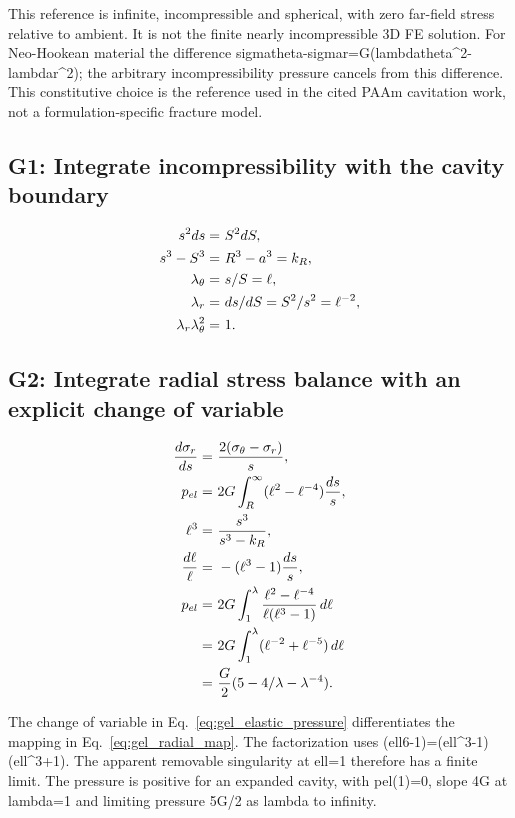 \documentclass[11pt]{article}
\begin{document}
This reference is infinite, incompressible and spherical, with zero far-field stress relative to ambient. It is not the finite nearly incompressible 3D FE solution. For Neo-Hookean material the difference sigmatheta-sigmar=G(lambdatheta\textasciicircum{}2-lambdar\textasciicircum{}2); the arbitrary incompressibility pressure cancels from this difference. This constitutive choice is the reference used in the cited PAAm cavitation work, not a formulation-specific fracture model.

\subsection{G1: Integrate incompressibility with the cavity boundary}

\begin{align}
s^2ds= & ~S^2dS, \notag \\
s^3-S^3= & ~R^3-a^3=k_R, \notag \\
\lambda_\theta= & ~s/S=\ell, \notag \\
\lambda_r= & ~ds/dS=S^2/s^2=\ell^{-2}, \notag \\
\lambda_r\lambda_\theta^2= & ~1. \label{eq:gel_radial_map}
\end{align}

\subsection{G2: Integrate radial stress balance with an explicit change of variable}

\begin{align}
\frac{d\sigma_r}{ds}= & ~\frac{2(\sigma_\theta-\sigma_r)}s, \notag \\
p_{el}= & ~2G\int_R^\infty(\ell^2-\ell^{-4})\frac{ds}s, \notag \\
\ell^3= & ~\frac{s^3}{s^3-k_R}, \notag \\
\frac{d\ell}{\ell}= & ~-(\ell^3-1)\frac{ds}s, \notag \\
p_{el}= & ~2G\int_1^\lambda\frac{\ell^2-\ell^{-4}}{\ell(\ell^3-1)}\,d\ell \notag \\
= & ~2G\int_1^\lambda(\ell^{-2}+\ell^{-5})\,d\ell \notag \\
= & ~\frac G2(5-4/\lambda-\lambda^{-4}). \label{eq:gel_elastic_pressure}
\end{align}

The change of variable in Eq.~\eqref{eq:gel_elastic_pressure} differentiates the mapping in Eq.~\eqref{eq:gel_radial_map}. The factorization uses (ell6-1)=(ell\textasciicircum{}3-1)(ell\textasciicircum{}3+1). The apparent removable singularity at ell=1 therefore has a finite limit. The pressure is positive for an expanded cavity, with pel(1)=0, slope 4G at lambda=1 and limiting pressure 5G/2 as lambda to infinity.
\end{document}
